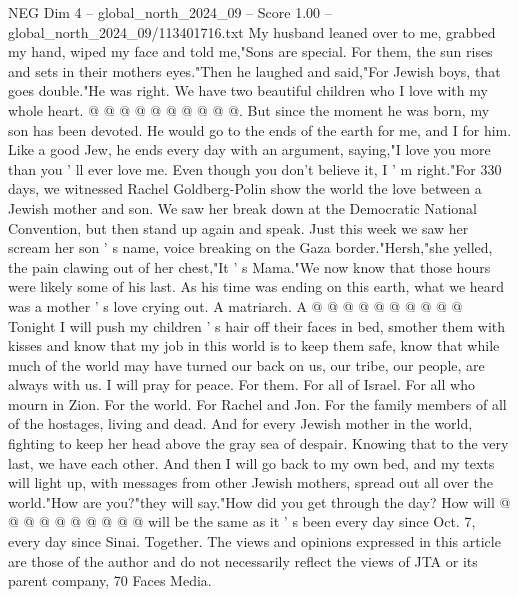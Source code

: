 \begin{textsample}{NEG Dim 4 – global\_north\_2024\_09 – Score 1.00 – global\_north\_2024\_09/113401716.txt}
My husband leaned over to me, grabbed my hand, wiped my face and told me,"Sons are special.
For them, the sun rises and sets in their mothers eyes."Then he laughed and said,"For Jewish boys, that goes double."He was right.
We have two beautiful children who I love with my whole heart. @ @ @ @ @ @ @ @ @ @.
But since the moment he was born, my son has been devoted.
He would go to the ends of the earth for me, and I for him.
Like a good Jew, he ends every day with an argument, saying,"I love you more than you ' ll ever love me.
Even though you don't believe it, I ' m right."For 330 days, we witnessed Rachel Goldberg-Polin show the world the love between a Jewish mother and son.
We saw her break down at the Democratic National Convention, but then stand up again and speak.
Just this week we saw her scream her son ' s name, voice breaking on the Gaza border."Hersh,"she yelled, the pain clawing out of her chest,"It ' s Mama."We now know that those hours were likely some of his last.
As his time was ending on this earth, what we heard was a mother ' s love crying out.
A matriarch.
A @ @ @ @ @ @ @ @ @ @ Tonight I will push my children ' s hair off their faces in bed, smother them with kisses and know that my job in this world is to keep them safe, know that while much of the world may have turned our back on us, our tribe, our people, are always with us.
I will pray for peace.
For them.
For all of Israel.
For all who mourn in Zion.
For the world.
For Rachel and Jon.
For the family members of all of the hostages, living and dead.
And for every Jewish mother in the world, fighting to keep her head above the gray sea of despair.
Knowing that to the very last, we have each other.
And then I will go back to my own bed, and my texts will light up, with messages from other Jewish mothers, spread out all over the world."How are you?"they will say."How did you get through the day?
How will @ @ @ @ @ @ @ @ @ @ will be the same as it ' s been every day since Oct. 7, every day since Sinai.
Together.
The views and opinions expressed in this article are those of the author and do not necessarily reflect the views of JTA or its parent company, 70 Faces Media.

\end{textsample}
